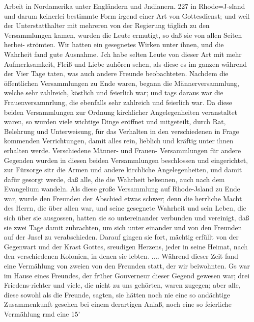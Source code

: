 Arbeit in Nordamerika unter Engländern und Jndianern. 227
in Rhode=J-sland und darum keinerlei bestimmte Form irgend
einer Art von Gottesdienst; und weil der Unterstatthalter mit
mehreren von der Regierung täglich zu den Versammlungen kamen,
wurden die Leute ermutigt, so daß sie von allen Seiten herbei-
strömten. Wir hatten ein gesegnetes Wirken unter ihnen, und
die Wahrheit fand gute Ausnahme. Jch habe selten Leute von
dieser Art mit mehr Aufmerksamkeit, Fleiß und Liebe zuhören
sehen, als diese es im ganzen während der Vier Tage taten, was
auch andere Freunde beobachteten. Nachdem die öffentlichen
Versammlungen zu Ende waren, begann die Männerversammlung,
welche sehr zahlreich, köstlich und feierlich war; und tags daraus
war die Frauenversamnrlung, die ebenfalls sehr zahlreich und
feierlich war. Da diese beiden Versammlungen zur Ordnung
kirchlicher Angelegenheiten veranstaltet waren, so wurden viele
wichtige Dinge eröffnet und mitgeteilt, durch Rat, Belehrung und
Unterweisung, für das Verhalten in den verschiedenen in Frage
kommenden Verrichtungen, damit alles rein, lieblich und kräftig
unter ihnen erhalten werde. Verschiedene Männer- und Frauen-
Versammlungen für andere Gegenden wurden in diesen beiden
Versammlungen beschlossen und eingerichtet, zur Fürsorge sitr die
Armen und andere kirchliche Angelegenheiten, und damit dafür
gesorgt werde, daß alle, die die Wahrheit bekennen, auch nach
dem Evangelium wandeln. Als diese große Versammlung auf
Rhode-Jsland zu Ende war, wurde den Freunden der Abschied
etwas schwer; denn die herrliche Macht des Herrn, die über allen
war, und seine gesegnete Wahrheit und sein Leben, die sich über sie
ausgossen, hatten sie so untereinander verbunden und vereinigt,
daß sie zwei Tage damit zubrachten, um sich unter einander und
von den Freunden auf der Jnsel zu verabschieden. Darauf gingen
sie fort, mächtig erfüllt von der Gegenwart und der Krast Gottes,
sreudigen Herzens, jeder in seine Heimat, nach den verschiedenen
Kolonien, in denen sie lebten. ....
Während dieser Zeit fand eine Vermählung von zweien von
den Freunden statt, der wir beiwohnten. Gs war im Hause
eines Freundes, der früher Gouverneur dieser Gegend gewesen war;
drei Friedens-richter und viele, die nicht zu uns gehörten, waren
zugegen; aber alle, diese sowohl als die Freunde, sagten, sie hätten
noch nie eine so andächtige Zusammenkunft gesehen bei einem
derartigen Anlaß, noch eine so feierliche Vermählung rmd eine
15’


